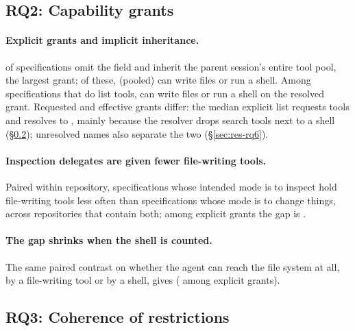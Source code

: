 \subsection{RQ2: Capability grants}
\label{sec:res-rq2}

\paragraph{Explicit grants and implicit inheritance.}
\RQtwoImplicitEng{} of specifications omit the  field and inherit the parent session's entire tool pool,
the largest grant; of these, \RQtwoImplicitCapableCount{} (pooled) can write files or run a shell. Among
specifications that do list tools, \RQtwoExplicitCapable{} can write files or run a shell on the resolved grant.
Requested and effective grants differ: the median explicit list requests \medianRequested{} tools and resolves to
\medianEffective{}, mainly because the resolver drops search tools next to a shell (\S\ref{sec:res-rq3}); unresolved
names also separate the two (\S\ref{sec:res-rq6}).

\paragraph{Inspection delegates are given fewer file-writing tools.}
Paired within repository, specifications whose intended mode is to inspect hold file-writing tools
\RQtwoRoleGapWrite{} less often than specifications whose mode is to change things, across \RQtwoRoleGapWriteRepos{}
repositories that contain both; among explicit grants the gap is \RQtwoRoleGapWriteExplicit{}.

\paragraph{The gap shrinks when the shell is counted.}
The same paired contrast on whether the agent can reach the file system at all, by a file-writing tool or by a shell,
gives \RQtwoRoleGapAuthority{} (\RQtwoRoleGapAuthorityExplicit{} among explicit grants).

\subsection{RQ3: Coherence of restrictions}
\label{sec:res-rq3}

